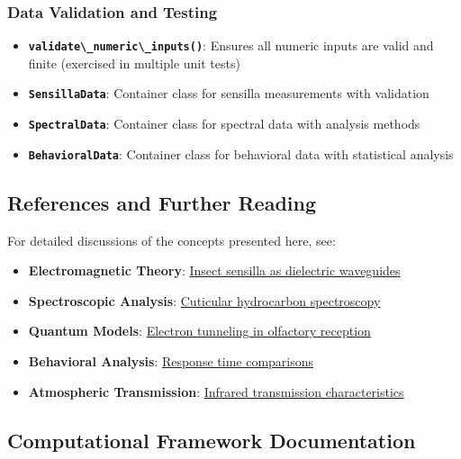 \documentclass[
  13pt,
  a4paperpaper,
  12pt]{article}
\newcommand{\passthrough}[1]{#1}
\providecommand{\tightlist}{%
  \setlength{\itemsep}{0pt}\setlength{\parskip}{0pt}}
\begin{document}
\subsubsection{Data Validation and
Testing}\label{data-validation-and-testing}

\begin{itemize}
\tightlist
\item
  \textbf{\passthrough{\lstinline!validate\_numeric\_inputs()!}}:
  Ensures all numeric inputs are valid and finite (exercised in multiple
  unit tests)
\item
  \textbf{\passthrough{\lstinline!SensillaData!}}: Container class for
  sensilla measurements with validation
\item
  \textbf{\passthrough{\lstinline!SpectralData!}}: Container class for
  spectral data with analysis methods
\item
  \textbf{\passthrough{\lstinline!BehavioralData!}}: Container class for
  behavioral data with statistical analysis
\end{itemize}

\subsection{References and Further
Reading}\label{references-and-further-reading}

For detailed discussions of the concepts presented here, see:

\begin{itemize}
\tightlist
\item
  \textbf{Electromagnetic Theory}:
  \href{https://doi.org/10.1016/j.jinsphys.2009.01.005}{Insect sensilla
  as dielectric waveguides}
\item
  \textbf{Spectroscopic Analysis}:
  \href{https://doi.org/10.1016/j.jinsphys.2008.12.017}{Cuticular
  hydrocarbon spectroscopy}
\item
  \textbf{Quantum Models}:
  \href{https://doi.org/10.1016/j.bpj.2008.12.3911}{Electron tunneling
  in olfactory reception}
\item
  \textbf{Behavioral Analysis}:
  \href{https://doi.org/10.1038/nrm2887}{Response time comparisons}
\item
  \textbf{Atmospheric Transmission}:
  \href{https://doi.org/10.1364/AO.45.005323}{Infrared transmission
  characteristics}
\end{itemize}

\subsection{Computational Framework
Documentation}\label{computational-framework-documentation}
\end{document}
